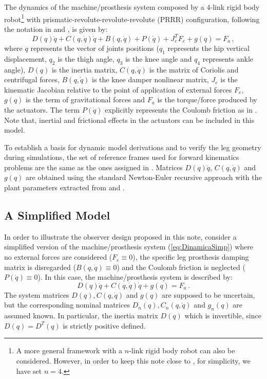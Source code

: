 \documentclass[letterpaper, 10 pt, conference]{ieeeconf}  %
\theoremstyle{plain}
\theoremstyle{definition}
\theoremstyle{remark}
\begin{document}
The dynamics of the machine/prosthesis system composed by a $4$-link rigid body robot\footnote{A more general framework with a $n$-link rigid body robot can also be considered. However, in order to keep this note close to \cite{Richter2015}, for simplicity, we have set $n=4$.} with prismatic-revolute-revolute-revolute (PRRR) configuration, following the notation in \cite{Richter2015} and \cite{Fakoorian2016}, is given by:
%
\begin{equation}
D(q)\ddot{q} + C(q,\dot{q})\dot{q}+B(q,\dot{q}) + P(\dot{q}) + J_e^T F_e+g(q) = F_a\,,
\label{eq:Dinamica}
\end{equation}
%
where  $q$ represents the vector of joints positions ($q_1$ represents the hip vertical displacement, $q_2$ is the thigh angle, $q_3$ is the knee angle and $q_4$ represents ankle angle), $D(q)$ is the inertia matrix, $C(q,\dot{q})$ is the matrix of Coriolis and centrifugal forces, $B(q,\dot{q})$ is the knee  damper nonlinear matrix, $J_e$ is the kinematic Jacobian relative to the point of application of external forces $F_e$, $g(q)$ is the term of gravitational forces and $F_a$ is the torque/force produced by the actuators. The term  $P(\dot{q})$ explicitly represents the Coulomb friction as in \cite{LeeKhalil2015}. Note that, inertial and frictional effects in the actuators can be included in this model. 

To establish a basis for dynamic model derivations and to verify the leg geometry during simulations, the set of reference frames used for forward kinematics problems are the same as the ones assigned in \cite{Richter2015}. Matrices $D(q)\ddot{q}$, $C(q,\dot{q})$ and $g(q)$ are obtained using the standard Newton-Euler recursive approach with the plant parameters extracted from \cite{Richter2015} and \cite{Fakoorian2016}.

\subsection{A Simplified Model}


In order to illustrate the observer design proposed in this note, consider a simplified version of the machine/prosthesis system (\ref{eq:DinamicaSimp}) where no external forces are considered ($F_e \equiv 0$), the specific leg prosthesis damping matrix is disregarded ($B(q,\dot{q}) \equiv 0$) and the  Coulomb friction is neglected  ($P(\dot{q}) \equiv 0$). In this case, the machine/prosthesis system is described by:
%
\begin{equation}
D(q)\ddot{q} + C(q,\dot{q})\dot{q}+g(q) = F_a\,.
\label{eq:DinamicaSimp}
\end{equation}
%
The system matrices $D(q), C(q,\dot{q})$ and $g(q)$ are supposed to be uncertain, but the corresponding nominal matrices  $D_n(q), C_n(q,\dot{q})$ and $g_n(q)$ are assumed known. In particular, the inertia matrix $D(q)$ which is invertible, since $D(q)=D^T(q)$ is strictly positive defined.
\end{document}
